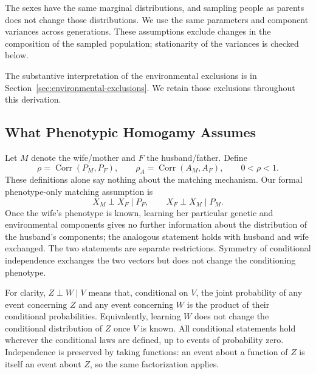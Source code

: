 The sexes have the same marginal distributions, and sampling people as
parents does not change those distributions. We use the same parameters
and component variances across generations. These assumptions exclude
changes in the composition of the sampled population; stationarity of
the variances is checked below.

The substantive interpretation of the environmental exclusions is in
Section~\ref{sec:environmental-exclusions}. We retain those exclusions
throughout this derivation.

\subsection{What Phenotypic Homogamy Assumes}
\label{sec:model-ph}

Let $M$ denote the wife/mother and $F$ the husband/father. Define
\[
 \rho=\operatorname{Corr}(P_M,P_F),\qquad
 \rho_A=\operatorname{Corr}(A_M,A_F),\qquad 0<\rho<1.
\]
These definitions alone say nothing about the matching mechanism.
Our formal phenotype-only matching assumption is
\begin{equation}
 X_M\perp X_F\mid P_F,\qquad X_F\perp X_M\mid P_M.
 \tag{PH}\label{eq:model-ph}
\end{equation}
Once the wife's phenotype is known, learning her particular genetic and
environmental components gives no further information about the
distribution of the husband's components; the analogous statement holds
with husband and wife exchanged. The two statements are separate
restrictions. Symmetry of conditional independence exchanges the two
vectors but does not change the conditioning phenotype.

For clarity, $Z\perp W\mid V$ means that, conditional on $V$, the joint
probability of any event concerning $Z$ and any event concerning $W$
is the product of their conditional probabilities. Equivalently, learning
$W$ does not change the conditional distribution of $Z$ once $V$ is known.
All conditional statements hold wherever the conditional laws are
defined, up to events of probability zero. Independence is preserved by
taking functions: an event about a function of $Z$ is itself an event
about $Z$, so the same factorization applies.

